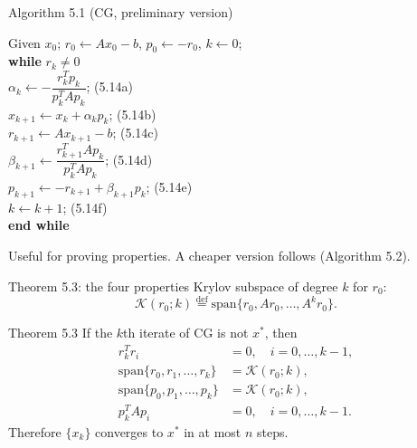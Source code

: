 \documentclass[12pt,aspectratio=169]{beamer}
\newcommand{\algblock}[1]{\begin{block}{}#1\end{block}}
\newcommand{\kw}[1]{\textbf{#1}}
\newcommand{\ind}{\hspace*{1.2em}}
\newcommand{\K}{\mathcal{K}}
\begin{document}
\begin{frame}{Algorithm 5.1 (CG, preliminary version)}
  \algblock{
    Given $x_0$; $r_0\leftarrow Ax_0-b$, $p_0\leftarrow-r_0$, $k\leftarrow0$;\\
    \kw{while} $r_k\neq0$\\
    \ind $\alpha_k\leftarrow -\dfrac{r_k^Tp_k}{p_k^TAp_k}$; \hfill (5.14a)\\[1ex]
    \ind $x_{k+1}\leftarrow x_k+\alpha_kp_k$; \hfill (5.14b)\\
    \ind $r_{k+1}\leftarrow Ax_{k+1}-b$; \hfill (5.14c)\\
    \ind $\beta_{k+1}\leftarrow \dfrac{r_{k+1}^TAp_k}{p_k^TAp_k}$; \hfill (5.14d)\\[1ex]
    \ind $p_{k+1}\leftarrow -r_{k+1}+\beta_{k+1}p_k$; \hfill (5.14e)\\
    \ind $k\leftarrow k+1$; \hfill (5.14f)\\
    \kw{end while}
  }
  Useful for proving properties. A cheaper version follows (Algorithm 5.2).
\end{frame}

\begin{frame}{Theorem 5.3: the four properties}
  Krylov subspace of degree $k$ for $r_0$:
  \begin{equation}
    \K(r_0;k) \overset{\text{def}}{=} \mathrm{span}\{r_0,Ar_0,\dots,A^kr_0\}. \tag{5.15}
  \end{equation}
  \begin{block}{Theorem 5.3}
    If the $k$th iterate of CG is not $x^*$, then
    \begin{align}
      r_k^Tr_i &= 0, \quad i=0,\dots,k-1, \tag{5.16}\\
      \mathrm{span}\{r_0,r_1,\dots,r_k\} &= \K(r_0;k), \tag{5.17}\\
      \mathrm{span}\{p_0,p_1,\dots,p_k\} &= \K(r_0;k), \tag{5.18}\\
      p_k^TAp_i &= 0, \quad i=0,\dots,k-1. \tag{5.19}
    \end{align}
    Therefore $\{x_k\}$ converges to $x^*$ in at most $n$ steps.
  \end{block}
\end{frame}
\end{document}
